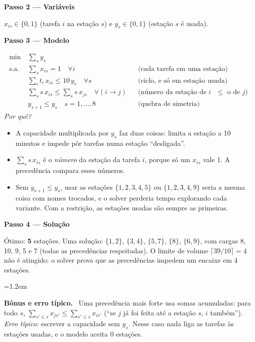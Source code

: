 \documentclass[11pt,a4paper]{article}
\newcommand{\passo}[1]{\par\medskip\textbf{#1}\par}
\newcommand{\porque}{\textit{Por quê?}\ }
\newenvironment{nota}[1]{\par\smallskip\begin{list}{}{\leftmargin=1.2em\rightmargin=0pt}\item[]\textbf{#1.}\ }{\end{list}}
\begin{document}
\passo{Passo 2 --- Variáveis}
$x_{is}\in\{0,1\}$ (tarefa $i$ na estação $s$) e $y_s\in\{0,1\}$ (estação $s$ é usada).

\passo{Passo 3 --- Modelo}
\begin{align*}
  \min\ & \sum_s y_s\\
  \text{s.a.}\ & \sum_s x_{is} = 1 \quad\forall i && \text{(cada tarefa em uma estação)}\\
  & \sum_i t_i\,x_{is} \le 10\,y_s \quad\forall s && \text{(ciclo, e só em estação usada)}\\
  & \sum_s s\,x_{is} \le \sum_s s\,x_{js} \quad\forall (i\to j) && \text{(número da estação de $i$ $\le$ o de $j$)}\\
  & y_{s+1} \le y_s \quad s=1,\dots,8 && \text{(quebra de simetria)}
\end{align*}
\porque
\begin{itemize}
  \item A capacidade multiplicada por $y_s$ faz duas coisas: limita a estação a 10 minutos e impede pôr tarefas numa
        estação ``desligada''.
  \item $\sum_s s\,x_{is}$ é o \emph{número} da estação da tarefa $i$, porque só um $x_{is}$ vale 1. A precedência compara esses
        números.
  \item Sem $y_{s+1}\le y_s$, usar as estações $\{1,2,3,4,5\}$ ou $\{1,2,3,4,9\}$ seria a mesma coisa com nomes trocados, e o
        solver perderia tempo explorando cada variante. Com a restrição, as estações usadas são sempre as primeiras.
\end{itemize}

\passo{Passo 4 --- Solução}
Ótimo: \textbf{5} estações. Uma solução: $\{1,2\}$, $\{3,4\}$, $\{5,7\}$, $\{8\}$, $\{6,9\}$, com cargas 8, 10, 9, 5 e 7 (todas as
precedências respeitadas). O limite de volume $\lceil 39/10\rceil=4$ não é atingido: o solver prova que as precedências
impedem um encaixe em 4 estações.

\begin{nota}{Bônus e erro típico}
Uma precedência mais forte usa somas acumuladas: para todo $s$, $\sum_{s'\le s}x_{js'}\le\sum_{s'\le s}x_{is'}$
(``se $j$ já foi feita até a estação $s$, $i$ também''). \textit{Erro típico:} escrever a capacidade sem $y_s$. Nesse caso
nada liga as tarefas às estações usadas, e o modelo aceita 0 estações.
\end{nota}

\end{document}
